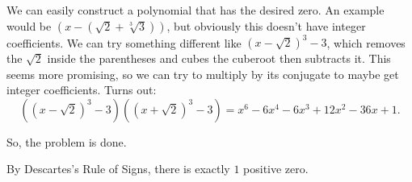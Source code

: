 \documentclass{report}
\begin{document}
\sol We can easily construct a polynomial that has the desired zero. An example would be $(x - (\sqrt{2} + \sqrt[3]{3}))$, but obviously this doesn't have integer coefficients. We can try something different like $(x - \sqrt{2})^3 - 3$, which removes the $\sqrt{2}$ inside the parentheses and cubes the cuberoot then subtracts it. This seems more promising, so we can try to multiply by its conjugate to maybe get integer coefficients. Turns out:
$$((x - \sqrt{2})^3 - 3)((x + \sqrt{2})^3 - 3) = x^6 -6x^4 -6x^3+12x^2-36x+1.$$

So, the problem is done.

\sol By Descartes's Rule of Signs, there is exactly $1$ positive zero. 	
\end{document}
